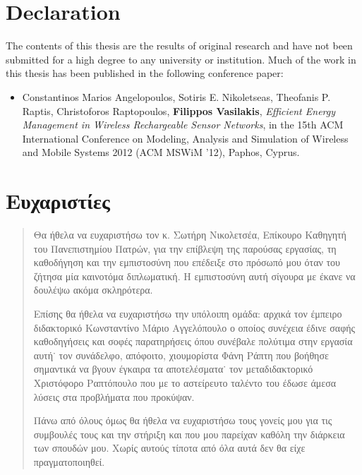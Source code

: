 \frontmatter
\chapter{Declaration}
The contents of this thesis are the results of original research and have not been submitted for a high degree to any university or institution. Much of the work in
this thesis has been published in the following conference paper:
\begin{itemize}
\item Constantinos Marios Angelopoulos, Sotiris E. Nikoletseas, Theofanis P. Raptis, Christoforos Raptopoulos, \textbf{Filippos Vasilakis}, \textit{Efficient Energy
Management in Wireless Rechargeable Sensor Networks}, in the 15th ACM International Conference on Modeling, Analysis and Simulation of Wireless and Mobile
Systems 2012 (ACM MSWiM ’12), Paphos, Cyprus.
\end{itemize}
\cleardoublepage
\chapter{Ευχαριστίες}
\begin{abstract}
Θα ήθελα να ευχαριστήσω τον κ. Σωτήρη Νικολετσέα, Επίκουρο Καθηγητή του Πανεπιστημίου Πατρών, για την επίβλεψη της παρούσας εργασίας, τη καθοδήγηση και την
εμπιστοσύνη που επέδειξε στο πρόσωπό μου όταν του ζήτησα μία καινοτόμα διπλωματική. Η εμπιστοσύνη αυτή σίγουρα με έκανε να δουλέψω ακόμα σκληρότερα.

Επίσης θα ήθελα να ευχαριστήσω την υπόλοιπη ομάδα: αρχικά τον έμπειρο διδακτορικό Κωνσταντίνο Μάριο Αγγελόπουλο ο οποίος συνέχεια έδινε σαφής καθοδηγήσεις και σοφές
παρατηρήσεις όπου συνέβαλε πολύτιμα στην εργασία αυτή˙ τον συνάδελφο, απόφοιτο, χιουμορίστα Φάνη Ράπτη που βοήθησε σημαντικά να βγουν έγκαιρα τα
αποτελέσματα˙ τον μεταδιδακτορικό Χριστόφορο Ραπτόπουλο που με το αστείρευτο ταλέντο του έδωσε άμεσα λύσεις στα προβλήματα που προκύψαν.

Πάνω από όλους όμως θα ήθελα να ευχαριστήσω τους γονείς μου για τις συμβουλές τους και την στήριξη και που μου παρείχαν καθόλη την
διάρκεια των σπουδών μου. Χωρίς αυτούς τίποτα από όλα αυτά δεν θα είχε πραγματοποιηθεί.

\end{abstract}
\cleardoublepage
\vspace{-10pt}
